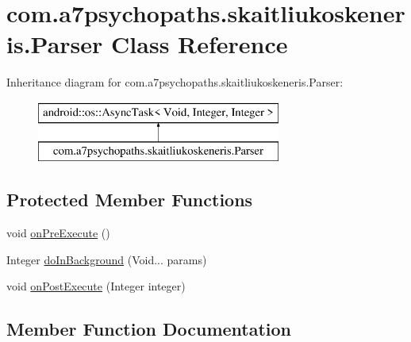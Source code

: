 \hypertarget{classcom_1_1a7psychopaths_1_1skaitliukoskeneris_1_1_parser}{}\section{com.\+a7psychopaths.\+skaitliukoskeneris.\+Parser Class Reference}
\label{classcom_1_1a7psychopaths_1_1skaitliukoskeneris_1_1_parser}
Inheritance diagram for com.\+a7psychopaths.\+skaitliukoskeneris.\+Parser\+:\begin{figure}[H]
\begin{center}
\leavevmode
\includegraphics[height=2.000000cm]{classcom_1_1a7psychopaths_1_1skaitliukoskeneris_1_1_parser}
\end{center}
\end{figure}
\subsection*{Protected Member Functions}
\begin{DoxyCompactItemize}
\item 
void \mbox{\hyperlink{classcom_1_1a7psychopaths_1_1skaitliukoskeneris_1_1_parser_a3c8f1848d81bc14088c6081fc5aded8b}{on\+Pre\+Execute}} ()
\item 
Integer \mbox{\hyperlink{classcom_1_1a7psychopaths_1_1skaitliukoskeneris_1_1_parser_a0ba11e5ef010ffc783ffc01205ad103f}{do\+In\+Background}} (Void... params)
\item 
void \mbox{\hyperlink{classcom_1_1a7psychopaths_1_1skaitliukoskeneris_1_1_parser_a5b4cc7934c9a9ccf7e19e44010b74608}{on\+Post\+Execute}} (Integer integer)
\end{DoxyCompactItemize}


\subsection{Member Function Documentation}
\mbox{\label{classcom_1_1a7psychopaths_1_1skaitliukoskeneris_1_1_parser_a0ba11e5ef010ffc783ffc01205ad103f}} 
